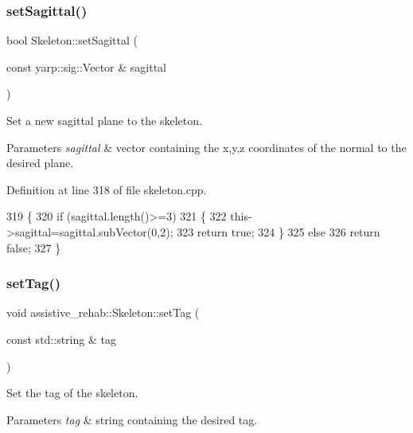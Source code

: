 \subsubsection{\texorpdfstring{set\+Sagittal()}{setSagittal()}}
{\footnotesize\ttfamily bool Skeleton\+::set\+Sagittal (\begin{DoxyParamCaption}\item[{const yarp\+::sig\+::\+Vector \&}]{sagittal }\end{DoxyParamCaption})}



Set a new sagittal plane to the skeleton. 


\begin{DoxyParams}{Parameters}
{\em sagittal} & vector containing the x,y,z coordinates of the normal to the desired plane. \\
\hline
\end{DoxyParams}


Definition at line 318 of file skeleton.\+cpp.


\begin{DoxyCode}
319 \{
320     \textcolor{keywordflow}{if} (sagittal.length()>=3)
321     \{
322         this->sagittal=sagittal.subVector(0,2);
323         \textcolor{keywordflow}{return} \textcolor{keyword}{true};
324     \}
325     \textcolor{keywordflow}{else}
326         \textcolor{keywordflow}{return} \textcolor{keyword}{false};
327 \}
\end{DoxyCode}
\mbox{\label{classassistive__rehab_1_1Skeleton_ae1c830e3d9a0ba692e5ae297caa52a82}} 
\subsubsection{\texorpdfstring{set\+Tag()}{setTag()}}
{\footnotesize\ttfamily void assistive\+\_\+rehab\+::\+Skeleton\+::set\+Tag (\begin{DoxyParamCaption}\item[{const std\+::string \&}]{tag }\end{DoxyParamCaption})\hspace{0.3cm}{\ttfamily [inline]}}



Set the tag of the skeleton. 


\begin{DoxyParams}{Parameters}
{\em tag} & string containing the desired tag. \\
\hline
\end{DoxyParams}


